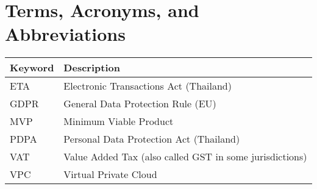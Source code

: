 \chapter*{Terms, Acronyms, and Abbreviations}

\begin{tabular}{@{}>{\raggedright\arraybackslash}p{2cm} p{}@{}}
	\textbf{Keyword} & \textbf{Description} \\
	\hline
	ETA  & Electronic Transactions Act (Thailand) \\
	GDPR & General Data Protection Rule (EU) \\
	MVP  & Minimum Viable Product \\
	PDPA  & Personal Data Protection Act (Thailand) \\
	VAT & Value Added Tax (also called GST in some jurisdictions) \\
	VPC & Virtual Private Cloud \\
	\hline
\end{tabular}

\vspace{1cm}


\clearpage
